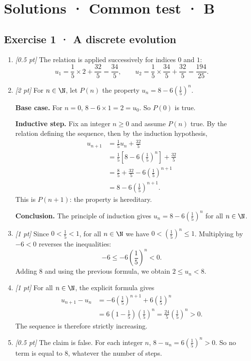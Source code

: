 \ifmxteacher\mxnewpage

\section*{Solutions · Common test · B}\label{cor:3-4}

\subsection*{Exercise 1 · A discrete evolution}\begin{enumerate}

\item \textit{[0.5 pt]} The relation is applied successively for indices $0$ and $1$:\[u_1=\frac{1}{5}\times 2+\frac{32}{5}=\frac{34}{5},\qquad u_2=\frac{1}{5}\times \frac{34}{5}+\frac{32}{5}=\frac{194}{25}.\]

\item \textit{[2 pt]} For $n\in\N$, let $P(n)$ the property $u_n=8-6\left(\frac{1}{5}\right)^n$.
\par\smallskip\textbf{Base case.} For $n=0$, $8-6\times1=2=u_0$. So $P(0)$ is true.
\par\smallskip\textbf{Inductive step.} Fix an integer $n\ge0$ and assume $P(n)$ true. By the relation defining the sequence, then by the induction hypothesis,
\[\begin{aligned}u_{n+1}&=\frac{1}{5}u_n+\frac{32}{5}\\
&=\frac{1}{5}\left[8-6\left(\frac{1}{5}\right)^n\right]+\frac{32}{5}\\
&=\frac{8}{5}+\frac{32}{5}-6\left(\frac{1}{5}\right)^{n+1}\\
&=8-6\left(\frac{1}{5}\right)^{n+1}.
\end{aligned}\]
This is $P(n+1)$: the property is hereditary.
\par\smallskip\textbf{Conclusion.} The principle of induction gives $u_n=8-6\left(\frac{1}{5}\right)^n$ for all $n\in\N$.

\item \textit{[1 pt]} Since $0<\frac{1}{5}<1$, for all $n\in\N$ we have $0<(\frac{1}{5})^n\le1$. Multiplying by $-6<0$ reverses the inequalities:
\[-6\le-6(\frac{1}{5})^n<0.\]
Adding $8$ and using the previous formula, we obtain $2\le u_n<8$.

\item \textit{[1 pt]} For all $n\in\N$, the explicit formula gives
\[\begin{aligned}u_{n+1}-u_n&=-6(\frac{1}{5})^{n+1}+6(\frac{1}{5})^n\\&=6(1-\frac{1}{5})(\frac{1}{5})^n=\frac{24}{5}(\frac{1}{5})^n>0.\end{aligned}\]
The sequence is therefore strictly increasing.

\item \textit{[0.5 pt]} The claim is false. For each integer $n$, $8-u_n=6(\frac{1}{5})^n>0$. So no term is equal to $8$, whatever the number of steps.

\end{enumerate}

